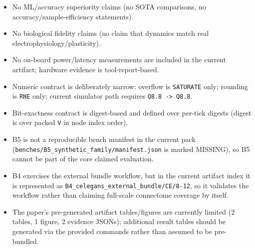 \begin{itemize}
\item No ML/accuracy superiority claims (no SOTA comparisons, no accuracy/sample-efficiency statements).
\item No biological fidelity claims (no claim that dynamics match real electrophysiology/plasticity).
\item No on-board power/latency measurements are included in the current artifact; hardware evidence is tool-report-based.
\item Numeric contract is deliberately narrow: overflow is \texttt{SATURATE} only; rounding is \texttt{RNE} only; current simulator path requires \texttt{Q8.8 -> Q8.8}.
\item Bit-exactness contract is digest-based and defined over per-tick digests (digest is over packed \texttt{V} in node index order).
\item B5 is not a reproducible bench manifest in the current pack (\texttt{benches/B5\_synthetic\_family/manifest.json} is marked MISSING), so B5 cannot be part of the core claimed evaluation.
\item B4 exercises the external bundle workflow, but in the current artifact index it is represented as \texttt{B4\_celegans\_external\_bundle/CE/8-12}, so it validates the workflow rather than claiming full-scale connectome coverage by itself.
\item The paper's pre-generated artifact tables/figures are currently limited (2 tables, 1 figure, 2 evidence JSONs); additional result tables should be generated via the provided commands rather than assumed to be pre-bundled.
\end{itemize}
